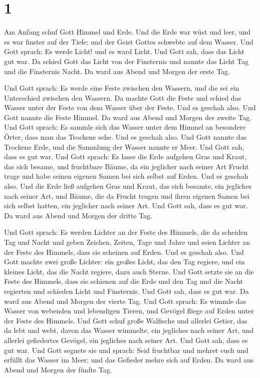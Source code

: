 \hypertarget{section}{%
\section{1}\label{section}}

 Am Anfang schuf Gott Himmel und Erde.  Und
die Erde war wüst und leer, und es war finster auf der Tiefe; und der
Geist Gottes schwebte auf dem Wasser.  Und Gott sprach: Es
werde Licht! und es ward Licht.  Und Gott sah, dass das
Licht gut war. Da schied Gott das Licht von der Finsternis
 und nannte das Licht Tag und die Finsternis Nacht. Da
ward aus Abend und Morgen der erste Tag.

 Und Gott sprach: Es werde eine Feste zwischen den
Wassern, und die sei ein Unterschied zwischen den Wassern.
 Da machte Gott die Feste und schied das Wasser unter der
Feste von dem Wasser über der Feste. Und es geschah also. 
Und Gott nannte die Feste Himmel. Da ward aus Abend und Morgen der
zweite Tag.  Und Gott sprach: Es sammle sich das Wasser
unter dem Himmel an besondere Örter, dass man das Trockene sehe. Und es
geschah also.  Und Gott nannte das Trockene Erde, und die
Sammlung der Wasser nannte er Meer. Und Gott sah, dass es gut war.
 Und Gott sprach: Es lasse die Erde aufgehen Gras und
Kraut, das sich besame, und fruchtbare Bäume, da ein jeglicher nach
seiner Art Frucht trage und habe seinen eigenen Samen bei sich selbst
auf Erden. Und es geschah also.  Und die Erde ließ
aufgehen Gras und Kraut, das sich besamte, ein jegliches nach seiner
Art, und Bäume, die da Frucht trugen und ihren eigenen Samen bei sich
selbst hatten, ein jeglicher nach seiner Art. Und Gott sah, dass es gut
war.  Da ward aus Abend und Morgen der dritte Tag.

 Und Gott sprach: Es werden Lichter an der Feste des
Himmels, die da scheiden Tag und Nacht und geben Zeichen, Zeiten, Tage
und Jahre  und seien Lichter an der Feste des Himmels,
dass sie scheinen auf Erden. Und es geschah also.  Und
Gott machte zwei große Lichter: ein großes Licht, das den Tag regiere,
und ein kleines Licht, das die Nacht regiere, dazu auch Sterne.
 Und Gott setzte sie an die Feste des Himmels, dass sie
schienen auf die Erde  und den Tag und die Nacht
regierten und schieden Licht und Finsternis. Und Gott sah, dass es gut
war.  Da ward aus Abend und Morgen der vierte Tag.
 Und Gott sprach: Es wimmle das Wasser von webenden und
lebendigen Tieren, und Gevögel fliege auf Erden unter der Feste des
Himmels.  Und Gott schuf große Walfische und allerlei
Getier, das da lebt und webt, davon das Wasser wimmelte, ein jegliches
nach seiner Art, und allerlei gefiedertes Gevögel, ein jegliches nach
seiner Art. Und Gott sah, dass es gut war.  Und Gott
segnete sie und sprach: Seid fruchtbar und mehret euch und erfüllt das
Wasser im Meer; und das Gefieder mehre sich auf Erden. 
Da ward aus Abend und Morgen der fünfte Tag.

